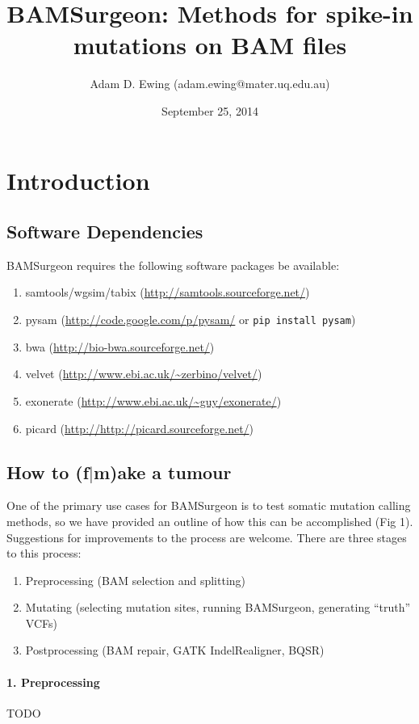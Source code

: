 \documentclass[letterpaper,11pt]{article}
\title{BAMSurgeon: Methods for spike-in mutations on BAM files}
\author{Adam D. Ewing (adam.ewing@mater.uq.edu.au)}
\begin{document}
 \date{September 25, 2014}
 \maketitle

\section{Introduction}
\subsection{Software Dependencies}
BAMSurgeon requires the following software packages be available:

\begin{enumerate}
  \item samtools/wgsim/tabix (\url{http://samtools.sourceforge.net/})
  \item pysam (\url{http://code.google.com/p/pysam/} or \texttt{pip install pysam})
  \item bwa (\url{http://bio-bwa.sourceforge.net/})
  \item velvet (\url{http://www.ebi.ac.uk/~zerbino/velvet/})
  \item exonerate (\url{http://www.ebi.ac.uk/~guy/exonerate/})
  \item picard (\url{http://http://picard.sourceforge.net/})
\end{enumerate}

\subsection{How to (f$\vert$m)ake a tumour}
One of the primary use cases for BAMSurgeon is to test somatic mutation calling methods, so we have provided an outline of how this can be accomplished (Fig 1). Suggestions for improvements to the process are welcome. There are three stages to this process:
\begin{enumerate}
\item Preprocessing (BAM selection and splitting)
\item Mutating (selecting mutation sites, running BAMSurgeon, generating ``truth'' VCFs)
\item Postprocessing (BAM repair, GATK IndelRealigner, BQSR)
\end{enumerate}

\paragraph{1. Preprocessing}
TODO
\end{document}
